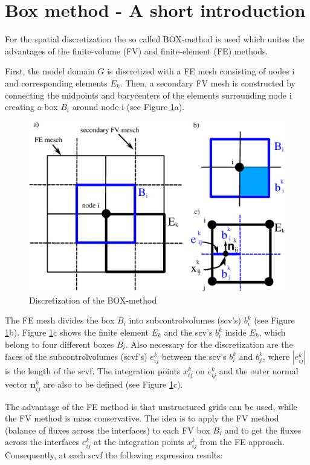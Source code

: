 \section{Box method - A short introduction}\label{box}

For the spatial discretization the so called BOX-method is used which unites the advantages of the finite-volume (FV) and finite-element (FE) methods. 

First, the model domain $G$ is discretized with a FE mesh consisting of nodes i and corresponding elements $E_k$. Then, a secondary FV mesh is constructed by connecting the midpoints and barycenters of the elements surrounding node i creating a box $B_i$ around node i (see Figure \ref{pc:box}a). 

\begin{figure} [h]
\includegraphics[width=0.8\linewidth,keepaspectratio]{EPS/box_disc}
\caption{\label{pc:box} Discretization of the BOX-method}
\end{figure}

The FE mesh divides the box $B_i$ into subcontrolvolumes (scv's) $b^k_i$ (see Figure \ref{pc:box}b). Figure \ref{pc:box}c shows the finite element $E_k$ and the scv's $b^k_i$ inside $E_k$, which belong to four different boxes $B_i$. Also necessary for the discretization are the faces of the subcontrolvolumes (scvf's) $e^k_{ij}$ between the scv's $b^k_i$ and $b^k_j$, where $|e^k_{ij}|$ is the length of the scvf. The integration points $x^k_{ij}$ on $e^k_{ij}$ and the outer normal vector $\mathbf n^k_{ij}$ are also to be defined (see Figure \ref{pc:box}c).

The advantage of the FE method is that unstructured grids can be used, while the FV method is mass conservative. The idea is to apply the FV method (balance of fluxes across the interfaces) to each FV box $B_i$  and to get the fluxes across the interfaces $e^k_{ij}$ at the integration points $x^k_{ij}$ from the FE approach. Consequently, at each scvf the following expression results:


